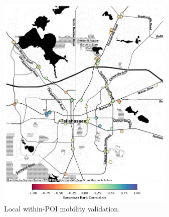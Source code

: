 \begin{figure}[htbp]
\centering
\includegraphics[width=85mm]{figures/local_win_cca.png}
\caption{Local within-POI mobility validation.}
\label{fig:local-win-cca}
\end{figure}
